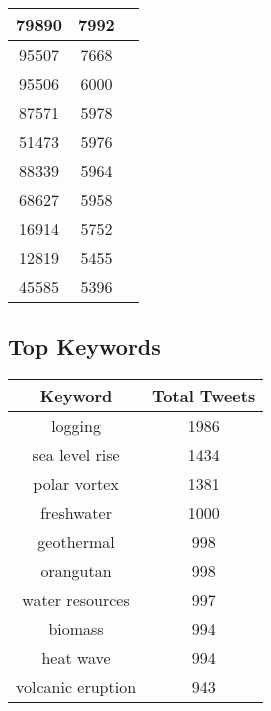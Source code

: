 \documentclass{article}\usepackage[T1]{fontenc}
\begin{document}
\begin{tabular}{|c|c|c|}
 \hline
79890 & 7992\\ 
 \hline
95507 & 7668\\ 
 \hline
95506 & 6000\\ 
 \hline
87571 & 5978\\ 
 \hline
51473 & 5976\\ 
 \hline
88339 & 5964\\ 
 \hline
68627 & 5958\\ 
 \hline
16914 & 5752\\ 
 \hline
12819 & 5455\\ 
 \hline
45585 & 5396\\ 
 \hline
\end{tabular}\subsection*{Top Keywords}\begin{tabular}{|c|c|}         \hline         Keyword & Total Tweets \\ 
 \hline
logging & 1986\\ 
 \hline
sea level rise & 1434\\ 
 \hline
polar vortex & 1381\\ 
 \hline
freshwater & 1000\\ 
 \hline
geothermal & 998\\ 
 \hline
orangutan & 998\\ 
 \hline
water resources & 997\\ 
 \hline
biomass & 994\\ 
 \hline
heat wave & 994\\ 
 \hline
volcanic eruption & 943\\ 
 \hline
\end{tabular}
\end{document}
